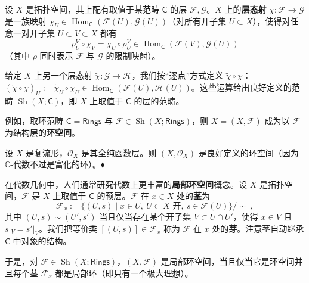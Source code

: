 \begin{Def}\label{def:7.13}
设 $X$ 是拓扑空间，其上配有取值于某范畴 $\mathsf C$ 的层 $\mathcal F,\mathcal G$。$X$ 上的\textbf{层态射} $\chi:\mathcal F\to\mathcal G$ 是一族映射 $\chi_U\in\operatorname{Hom}_{\mathsf C}(\mathcal F(U),\mathcal G(U))$（对所有开子集 $U\subset X$），使得对任意一对开子集 $U\subset V\subset X$ 都有
\[
\rho_U^V\circ\chi_V=\chi_U\circ\rho_U^V\in\operatorname{Hom}_{\mathsf C}(\mathcal F(V),\mathcal G(U))
\]
（其中 $\rho$ 同时表示 $\mathcal F$ 与 $\mathcal G$ 的限制映射）。

给定 $X$ 上另一个层态射 $\tilde\chi:\mathcal G\to\mathcal H$，我们按“逐点”方式定义 $\tilde\chi\circ\chi$：$(\tilde\chi\circ\chi)_U:=\tilde\chi_U\circ\chi_U\in\operatorname{Hom}_{\mathsf C}(\mathcal F(U),\mathcal H(U))$。这些运算给出良好定义的范畴 $\operatorname{Sh}(X;\mathsf C)$，即 $X$ 上取值于 $\mathsf C$ 的层的范畴。
\end{Def}

例如，取环范畴 $\mathsf C=\mathsf{Rings}$ 与 $\mathcal F\in\operatorname{Sh}(X;\mathsf{Rings})$，则 $X=(X,\mathcal F)$ 成为以 $\mathcal F$ 为结构层的\textbf{环空间}。

\begin{Ex}\label{ex:7.14}
设 $X$ 是复流形，$\mathcal O_X$ 是其全纯函数层。则 $(X,\mathcal O_X)$ 是良好定义的环空间（因为 $\mathbb C$-代数不过是富化的环）。\hfill$\blacklozenge$
\end{Ex}

\begin{center}
\end{center}

\begin{Rem}\label{rem:7.15}
在代数几何中，人们通常研究代数上更丰富的\textbf{局部环空间}概念。设 $X$ 是拓扑空间，$\mathcal F$ 是 $X$ 上取值于 $\mathsf C$ 的预层。$\mathcal F$ 在 $x\in X$ 处的\textbf{茎}为
\[
\mathcal F_x:=\{(U,s)\mid x\in U,\ U\subset X\text{ 开},\ s\in\mathcal F(U)\}/\sim\;,
\]
其中 $(U,s)\sim(U',s')$ 当且仅当存在某个开子集 $V\subset U\cap U'$，使得 $x\in V$ 且 $s|_V=s'|_V$。我们把等价类 $[(U,s)]\in\mathcal F_x$ 称为 $\mathcal F$ 在 $x$ 处的\textbf{芽}。注意茎自动继承 $\mathsf C$ 中对象的结构。

于是，对 $\mathcal F\in\operatorname{Sh}(X;\mathsf{Rings})$，$(X,\mathcal F)$ 是局部环空间，当且仅当它是环空间并且每个茎 $\mathcal F_x$ 都是局部环（即只有一个极大理想）。
\end{Rem}

